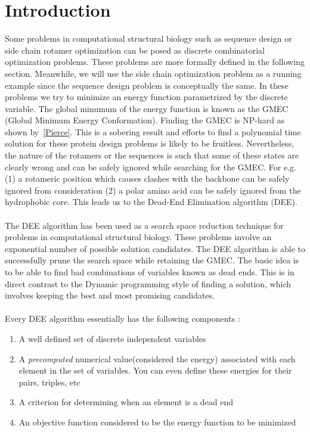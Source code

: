 \documentclass{article}
\begin{document}
\section{Introduction}
Some problems in computational structural biology such as sequence design or side chain rotamer optimization can be posed as discrete combinatorial optimization problems. These problems are more formally defined in the following section. Meanwhile, we will use the side chain optimization problem as a running example since the sequence design problem is conceptually the same.  In these problems we try to minimize an energy function parametrized by the discrete variable. The global minumum of the energy function is known as the GMEC (Global Minimum Energy Conformation). Finding the GMEC is NP-hard as shown by~\ref{Pierce}. This is a sobering result and efforts to find a polynomial time solution for these protein design problems is likely to be fruitless. Nevertheless, the nature of the rotamers or the sequences is such that some of these states are clearly wrong and can be safely ignored while searching for the GMEC. For e.g.(1) a rotameric position which causes clashes with the backbone can be safely ignored from consideration (2) a polar amino acid can be safely ignored from the hydrophobic core. This leads us to the Dead-End Elimination algorithm (DEE). 
\\
\\
The DEE algorithm has been used as a search space reduction technique for problems in computational structural biology. These problems involve an exponential number of possible solution candidates. The DEE algorithm is able to successfully prune the search space while retaining the GMEC. The basic idea  is to be able to find bad combinations of variables known as dead ends. This is in direct contrast to the Dynamic programming style of finding a solution, which involves keeping the best and most promising candidates. 
\\
\\
Every DEE algorithm essentially has the following components :
\begin{enumerate}
\item A well defined set of discrete independent variables
\item A \emph{precomputed} numerical value(considered the energy) associated with each element in the set of variables. You can even define these energies for their pairs, triples, etc
\item A criterion for determining when an element is a dead end
\item An objective function considered to be the energy function to be minimized
\end{enumerate}
\end{document}
